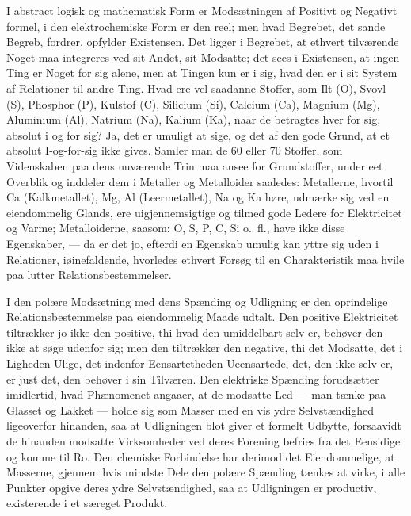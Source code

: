 \documentclass[12pt,a4paper]{book}
\begin{document}
I abstract logisk og mathematisk Form er Modsætningen
af Positivt og Negativt formel, i den elektrochemiske Form er
den reel; men hvad Begrebet, det sande Begreb, fordrer,
opfylder Existensen. Det ligger i Begrebet, at ethvert tilværende
Noget maa integreres ved sit Andet, sit Modsatte; det sees i
Existensen, at ingen Ting er Noget for sig alene, men at
Tingen kun er i sig, hvad den er i sit System af Relationer
til andre Ting. Hvad ere vel saadanne Stoffer, som Ilt
(O), Svovl (S), Phosphor (P), Kulstof (C), Silicium (Si),
Calcium (Ca), Magnium (Mg), Aluminium (Al), Natrium
(Na), Kalium (Ka), naar de betragtes hver for sig, absolut
i og for sig? Ja, det er umuligt at sige, og det af den gode
Grund, at et absolut I-og-for-sig ikke gives. Samler man
de 60 eller 70 Stoffer, som Videnskaben paa dens nuværende
Trin maa ansee for Grundstoffer, under eet Overblik og inddeler
dem i Metaller og Metalloider saaledes: Metallerne,
hvortil Ca (Kalkmetallet), Mg, Al (Leermetallet), Na og Ka
høre, udmærke sig ved en eiendommelig Glands, ere uigjennemsigtige
og tilmed gode Ledere for Elektricitet og Varme; Metalloiderne,
saasom: O, S, P, C, Si o.\ fl., have ikke disse
Egenskaber, --- da er det jo, efterdi en Egenskab umulig kan yttre
sig uden i Relationer, iøinefaldende, hvorledes ethvert Forsøg
til en Charakteristik maa hvile paa lutter Relationsbestemmelser.

I den polære Modsætning med dens Spænding og Udligning
er den oprindelige Relationsbestemmelse paa eiendommelig
Maade udtalt. Den positive Elektricitet tiltrækker
jo ikke den positive, thi hvad den umiddelbart selv er, behøver
den ikke at søge udenfor sig; men den tiltrækker den negative,
thi det Modsatte, det i Ligheden Ulige, det indenfor Eensartetheden
Ueensartede, det, den ikke selv er, er just det, den
behøver i sin Tilværen. Den elektriske Spænding forudsætter
imidlertid, hvad Phænomenet angaaer, at de modsatte
Led --- man tænke paa Glasset og Lakket --- holde sig som Masser
med en vis ydre Selvstændighed ligeoverfor hinanden, saa at
Udligningen blot giver et formelt Udbytte, forsaavidt de hinanden
modsatte Virksomheder ved deres Forening befries fra
det Eensidige og komme til Ro. Den chemiske Forbindelse
har derimod det Eiendommelige, at Masserne, gjennem hvis
mindste Dele den polære Spænding tænkes at virke, i alle
Punkter opgive deres ydre Selvstændighed, saa at Udligningen
er productiv, existerende i et særeget Produkt.
\end{document}
